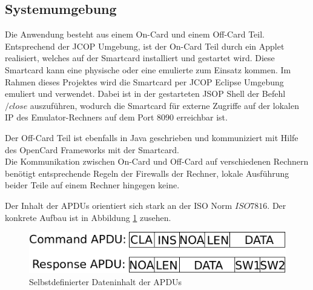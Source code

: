 \subsection{Systemumgebung}
\label{subsec:3.1}

Die Anwendung besteht aus einem On-Card und einem Off-Card Teil.
Entsprechend der JCOP Umgebung, ist der On-Card Teil durch ein Applet realisiert, welches auf der Smartcard installiert und gestartet wird.
Diese Smartcard kann eine physische oder eine emulierte zum Einsatz kommen.
Im Rahmen dieses Projektes wird die Smartcard per JCOP Eclipse Umgebung emuliert und verwendet.
Dabei ist in der gestarteten JSOP Shell der Befehl $/close$ auszuführen, wodurch die Smartcard für externe  Zugriffe auf der lokalen IP des Emulator-Rechners auf dem Port 8090 erreichbar ist.

Der Off-Card Teil ist ebenfalls in Java geschrieben und kommuniziert mit Hilfe des OpenCard Frameworks mit der Smartcard.
\\

Die Kommunikation zwischen On-Card und Off-Card auf verschiedenen Rechnern benötigt entsprechende Regeln der Firewalls der Rechner, lokale Ausführung beider Teile auf einem Rechner hingegen keine.

Der Inhalt der APDUs orientiert sich stark an der ISO Norm $ISO7816$. Der konkrete Aufbau ist in Abbildung \ref{myapdu} zusehen.

\begin{figure}[htb]
\begin{center}
 \includegraphics[width=1\hsize]{./images/myapdu.png}
\end{center}
\caption[Selbstdefinierter Dateninhalt der APDUs]{\label{myapdu}Selbstdefinierter Dateninhalt der APDUs}
\end{figure}



